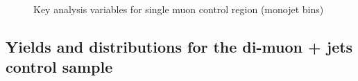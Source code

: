 \begin{figure}
\begin{center}
         \\
        \caption{Key analysis variables for single muon control region (monojet bins)}
        \label{fig:distribution_singlemu_mono}
    \end{center}
\end{figure}

\clearpage
\subsection{Yields and distributions for the di-muon + jets control sample}





